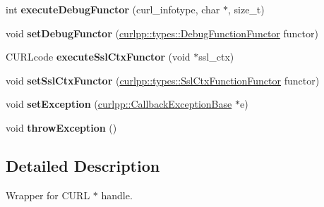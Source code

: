 \begin{DoxyCompactItemize}
\item 
\hypertarget{classcurlpp_1_1internal_1_1CurlHandle_a1de5d35d03a2400e21bfd5b3e4f331e6}{int {\bfseries execute\-Debug\-Functor} (curl\-\_\-infotype, char $\ast$, size\-\_\-t)}\label{classcurlpp_1_1internal_1_1CurlHandle_a1de5d35d03a2400e21bfd5b3e4f331e6}

\item 
\hypertarget{classcurlpp_1_1internal_1_1CurlHandle_abe1061232803c541f99c446d8d6a1edd}{void {\bfseries set\-Debug\-Functor} (\hyperlink{classutilspp_1_1Functor}{curlpp\-::types\-::\-Debug\-Function\-Functor} functor)}\label{classcurlpp_1_1internal_1_1CurlHandle_abe1061232803c541f99c446d8d6a1edd}

\item 
\hypertarget{classcurlpp_1_1internal_1_1CurlHandle_a8e3ef0099fd8dd1d0c4c342479fa5edc}{C\-U\-R\-Lcode {\bfseries execute\-Ssl\-Ctx\-Functor} (void $\ast$ssl\-\_\-ctx)}\label{classcurlpp_1_1internal_1_1CurlHandle_a8e3ef0099fd8dd1d0c4c342479fa5edc}

\item 
\hypertarget{classcurlpp_1_1internal_1_1CurlHandle_a01ff1b85447df61c5cf01ce969b1f86a}{void {\bfseries set\-Ssl\-Ctx\-Functor} (\hyperlink{classutilspp_1_1Functor}{curlpp\-::types\-::\-Ssl\-Ctx\-Function\-Functor} functor)}\label{classcurlpp_1_1internal_1_1CurlHandle_a01ff1b85447df61c5cf01ce969b1f86a}

\item 
\hypertarget{classcurlpp_1_1internal_1_1CurlHandle_ac84ef815b10c99f21e48b59988e9801c}{void {\bfseries set\-Exception} (\hyperlink{classcurlpp_1_1CallbackExceptionBase}{curlpp\-::\-Callback\-Exception\-Base} $\ast$e)}\label{classcurlpp_1_1internal_1_1CurlHandle_ac84ef815b10c99f21e48b59988e9801c}

\item 
\hypertarget{classcurlpp_1_1internal_1_1CurlHandle_af75c10e8106f51806e7347a51d8824c8}{void {\bfseries throw\-Exception} ()}\label{classcurlpp_1_1internal_1_1CurlHandle_af75c10e8106f51806e7347a51d8824c8}

\end{DoxyCompactItemize}


\subsection{Detailed Description}
Wrapper for C\-U\-R\-L $\ast$ handle. 

